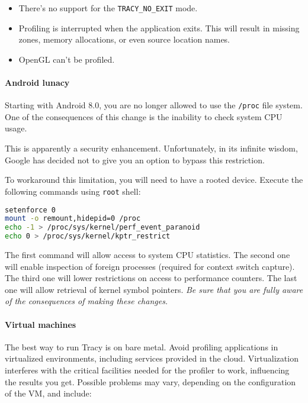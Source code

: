 \documentclass[hidelinks,titlepage,a4paper,twoside]{article}
\begin{document}
\begin{itemize}
\item There's no support for the \texttt{TRACY\_NO\_EXIT} mode.
\item Profiling is interrupted when the application exits. This will result in missing zones, memory allocations, or even source location names.
\item OpenGL can't be profiled.
\end{itemize}

\paragraph{Android lunacy}
\label{androidlunacy}

Starting with Android 8.0, you are no longer allowed to use the \texttt{/proc} file system. One of the consequences of this change is the inability to check system CPU usage.

This is apparently a security enhancement. Unfortunately, in its infinite wisdom, Google has decided not to give you an option to bypass this restriction.

To workaround this limitation, you will need to have a rooted device. Execute the following commands using \texttt{root} shell:

\begin{lstlisting}[language=sh]
setenforce 0
mount -o remount,hidepid=0 /proc
echo -1 > /proc/sys/kernel/perf_event_paranoid
echo 0 > /proc/sys/kernel/kptr_restrict
\end{lstlisting}

The first command will allow access to system CPU statistics. The second one will enable inspection of foreign processes (required for context switch capture). The third one will lower restrictions on access to performance counters. The last one will allow retrieval of kernel symbol pointers. \emph{Be sure that you are fully aware of the consequences of making these changes.}

\paragraph{Virtual machines}

The best way to run Tracy is on bare metal. Avoid profiling applications in virtualized environments, including services provided in the cloud. Virtualization interferes with the critical facilities needed for the profiler to work, influencing the results you get. Possible problems may vary, depending on the configuration of the VM, and include:
\end{document}
